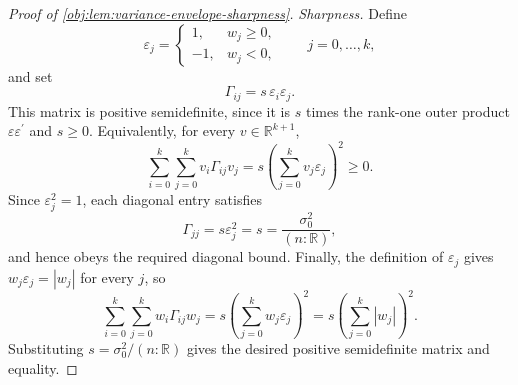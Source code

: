 \begin{proof}[Proof of \cref{obj:lem:variance-envelope-sharpness}]
\emph{Sharpness.}
Define
\[
\varepsilon_j=
\begin{cases}
1,& w_j\ge0,\\
-1,& w_j<0,
\end{cases}
\qquad j=0,\ldots,k,
\]
and set
\[
\Gamma_{ij}=s\,\varepsilon_i\varepsilon_j.
\]
This matrix is positive semidefinite, since it is \(s\) times the rank-one outer product \(\varepsilon\varepsilon^\prime\) and \(s\ge0\). Equivalently, for every \(v\in\mathbb R^{k+1}\),
\[
\sum_{i=0}^k\sum_{j=0}^k v_i\Gamma_{ij}v_j
=
s\left(\sum_{j=0}^k v_j\varepsilon_j\right)^2
\ge0.
\]
Since \(\varepsilon_j^2=1\), each diagonal entry satisfies
\[
\Gamma_{jj}=s\varepsilon_j^2=s=\frac{\sigma_0^2}{(n:\mathbb R)},
\]
and hence obeys the required diagonal bound. Finally, the definition of \(\varepsilon_j\) gives \(w_j\varepsilon_j=|w_j|\) for every \(j\), so
\[
\sum_{i=0}^k\sum_{j=0}^k w_i\Gamma_{ij}w_j
=
s\left(\sum_{j=0}^k w_j\varepsilon_j\right)^2
=
s\left(\sum_{j=0}^k |w_j|\right)^2.
\] %
Substituting \(s=\sigma_0^2/(n:\mathbb R)\) gives the desired positive semidefinite matrix and equality. %
\end{proof}
